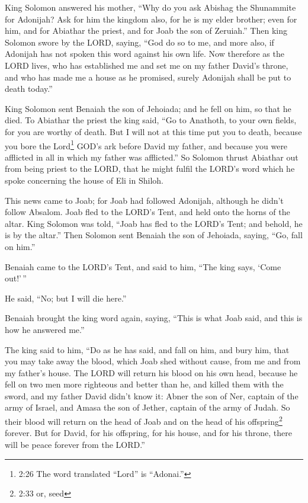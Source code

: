  King Solomon answered his mother, ``Why do you ask Abishag
the Shunammite for Adonijah? Ask for him the kingdom also, for he is my
elder brother; even for him, and for Abiathar the priest, and for Joab
the son of Zeruiah.''  Then king Solomon swore by the LORD,
saying, ``God do so to me, and more also, if Adonijah has not spoken
this word against his own life.  Now therefore as the LORD
lives, who has established me and set me on my father David's throne,
and who has made me a house as he promised, surely Adonijah shall be put
to death today.''

 King Solomon sent Benaiah the son of Jehoiada; and he fell
on him, so that he died.  To Abiathar the priest the king
said, ``Go to Anathoth, to your own fields, for you are worthy of death.
But I will not at this time put you to death, because you bore the
Lord\footnote{2:26 The word translated ``Lord'' is ``Adonai.''} GOD's
ark before David my father, and because you were afflicted in all in
which my father was afflicted.''  So Solomon thrust
Abiathar out from being priest to the LORD, that he might fulfil the
LORD's word which he spoke concerning the house of Eli in Shiloh.

 This news came to Joab; for Joab had followed Adonijah,
although he didn't follow Absalom. Joab fled to the LORD's Tent, and
held onto the horns of the altar.  King Solomon was told,
``Joab has fled to the LORD's Tent; and behold, he is by the altar.''
Then Solomon sent Benaiah the son of Jehoiada, saying, ``Go, fall on
him.''

 Benaiah came to the LORD's Tent, and said to him, ``The
king says, `Come out!'\,''

He said, ``No; but I will die here.''

Benaiah brought the king word again, saying, ``This is what Joab said,
and this is how he answered me.''

 The king said to him, ``Do as he has said, and fall on
him, and bury him, that you may take away the blood, which Joab shed
without cause, from me and from my father's house.  The
LORD will return his blood on his own head, because he fell on two men
more righteous and better than he, and killed them with the sword, and
my father David didn't know it: Abner the son of Ner, captain of the
army of Israel, and Amasa the son of Jether, captain of the army of
Judah.  So their blood will return on the head of Joab and
on the head of his offspring\footnote{2:33 or, seed} forever. But for
David, for his offspring, for his house, and for his throne, there will
be peace forever from the LORD.''

